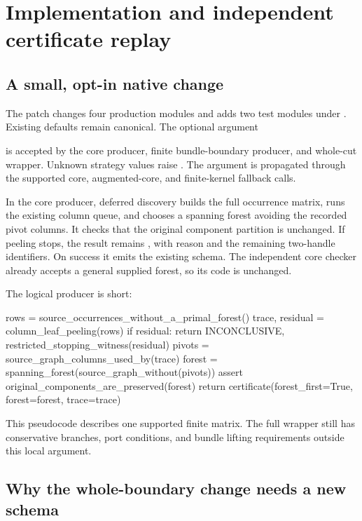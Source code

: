 \section{Implementation and independent certificate replay}
\label{sec:implementation}

\subsection{A small, opt-in native change}

The patch changes four production modules and adds two test modules under
.  Existing defaults remain
canonical.  The optional argument
\begin{center}
\end{center}
is accepted by the core producer, finite bundle-boundary producer, and
whole-cut wrapper.  Unknown strategy values raise .
The argument is propagated through the supported core, augmented-core,
and finite-kernel fallback calls.

In the core producer, deferred discovery builds the full occurrence
matrix, runs the existing column queue, and chooses a spanning forest
avoiding the recorded pivot columns.  It checks that the original
component partition is unchanged.  If peeling stops, the result remains
, with reason
 and the remaining two-handle
identifiers.  On success it emits the existing
 schema.  The independent core checker
already accepts a general supplied forest, so its code is unchanged.

The logical producer is short:
\begin{Code}
rows = source_occurrences_without_a_primal_forest()
trace, residual = column_leaf_peeling(rows)
if residual:
    return INCONCLUSIVE, restricted_stopping_witness(residual)
pivots = source_graph_columns_used_by(trace)
forest = spanning_forest(source_graph_without(pivots))
assert original_components_are_preserved(forest)
return certificate(forest_first=True, forest=forest, trace=trace)
\end{Code}
This pseudocode describes one supported finite matrix.  The full wrapper
still has conservative branches, port conditions, and bundle lifting
requirements outside this local argument.

\subsection{Why the whole-boundary change needs a new schema}

